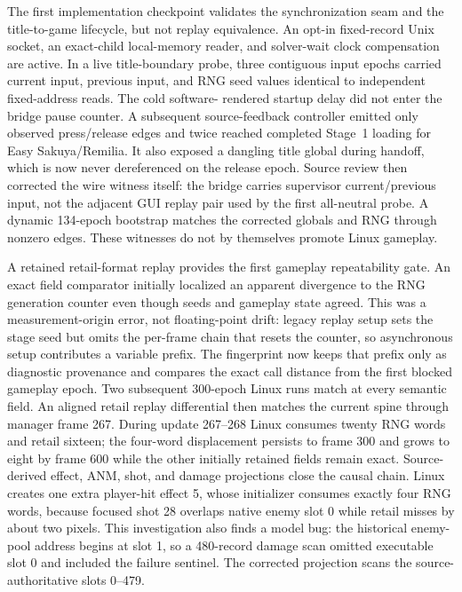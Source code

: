 \documentclass[10pt]{article}
\begin{document}
The first implementation checkpoint validates the synchronization seam and
the title-to-game lifecycle, but not replay equivalence.
An opt-in fixed-record Unix socket, an exact-child local-memory reader, and
solver-wait clock compensation are active.  In a live title-boundary probe,
three contiguous input epochs carried current input, previous input, and RNG
seed values identical to independent fixed-address reads.  The cold software-
rendered startup delay did not enter the bridge pause counter.  A subsequent
source-feedback controller emitted only observed press/release edges and twice
reached completed Stage~1 loading for Easy Sakuya/Remilia.  It also exposed a
dangling title global during handoff, which is now never dereferenced on the
release epoch.  Source review then corrected the wire witness itself: the
bridge carries supervisor current/previous input, not the adjacent GUI replay
pair used by the first all-neutral probe.  A dynamic 134-epoch bootstrap
matches the corrected globals and RNG through nonzero edges.  These witnesses
do not by themselves promote Linux gameplay.

A retained retail-format replay provides the first gameplay repeatability
gate.  An exact field comparator initially localized an apparent divergence to
the RNG generation counter even though seeds and gameplay state agreed.  This
was a measurement-origin error, not floating-point drift: legacy replay setup
sets the stage seed but omits the per-frame chain that resets the counter, so
asynchronous setup contributes a variable prefix.  The fingerprint now keeps
that prefix only as diagnostic provenance and compares the exact call distance
from the first blocked gameplay epoch.  Two subsequent 300-epoch Linux runs
match at every semantic field.  An aligned retail replay differential then
matches the current spine through manager frame 267.  During update 267--268
Linux consumes twenty RNG words and retail sixteen; the four-word displacement
persists to frame 300 and grows to eight by frame 600 while the other initially
retained fields remain exact.  Source-derived effect, ANM, shot, and damage
projections close the causal chain.  Linux creates one extra player-hit effect
5, whose initializer consumes exactly four RNG words, because focused shot 28
overlaps native enemy slot 0 while retail misses by about two pixels.  This
investigation also finds a model bug: the historical enemy-pool address begins
at slot 1, so a 480-record damage scan omitted executable slot 0 and included
the failure sentinel.  The corrected projection scans the source-authoritative
slots 0--479.
\end{document}
